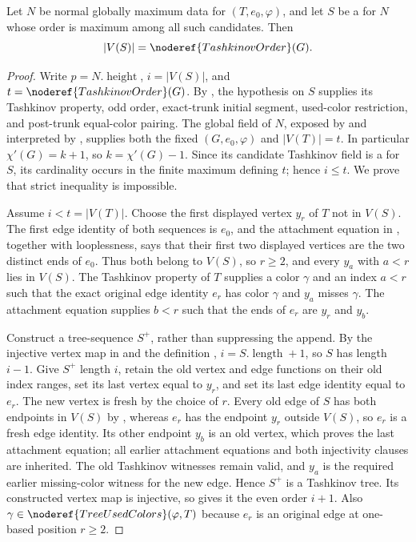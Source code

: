 \begin{helper}
Let $N$ be normal globally maximum data for $(T,e_0,\varphi)$, and let
$S$ be a  for $N$ whose order is maximum
among all such candidates.  Then
\[
 |V(S)|=\noderef{TashkinovOrder}(G).
\]
\end{helper}
\begin{proof}
Write $p=N.\operatorname{height}$, $i=|V(S)|$, and
$t=\noderef{TashkinovOrder}(G)$.  By
, the hypothesis on $S$ supplies its
Tashkinov property, odd order, exact-trunk initial segment, used-color
restriction, and post-trunk equal-color pairing.  The global field of $N$,
exposed by  and interpreted by
, supplies both the fixed
 $(G,e_0,\varphi)$ and $|V(T)|=t$.  In particular
$\chi'(G)=k+1$, so $k=\chi'(G)-1$.  Since its candidate Tashkinov field is
a  for $S$, its cardinality occurs in the finite
maximum defining $t$; hence $i\le t$.  We prove that strict inequality is
impossible.

Assume $i<t=|V(T)|$.  Choose the first displayed vertex $y_r$ of $T$ not
in $V(S)$.  The first edge identity of both sequences is $e_0$, and the
attachment equation in , together with looplessness,
says that their first two displayed vertices are the two distinct ends of
$e_0$.  Thus both belong to $V(S)$, so $r\ge2$, and every $y_a$ with
$a<r$ lies in $V(S)$.  The Tashkinov property of $T$ supplies a color
$\gamma$ and an index $a<r$ such that the exact original edge identity
$e_r$ has color $\gamma$ and $y_a$ misses $\gamma$.  The attachment
equation supplies $b<r$ such that the ends of $e_r$ are $y_r$ and $y_b$.

Construct a tree-sequence $S^+$, rather than suppressing the append.  By
the injective vertex map in  and the definition
, $i=S.\operatorname{length}+1$, so $S$ has
length $i-1$.  Give $S^+$ length $i$, retain the old vertex and edge
functions on their old index ranges, set its last vertex equal to $y_r$,
and set its last edge identity equal to $e_r$.  The new vertex is fresh by
the choice of $r$.  Every old edge of $S$ has both endpoints in $V(S)$ by
, whereas $e_r$ has the endpoint $y_r$ outside
$V(S)$, so $e_r$ is a fresh edge identity.  Its other endpoint $y_b$ is an
old vertex, which proves the last attachment equation; all earlier
attachment equations and both injectivity clauses are inherited.  The old
Tashkinov witnesses remain valid, and $y_a$ is the required earlier
missing-color witness for the new edge.  Hence $S^+$ is a Tashkinov tree.
Its constructed vertex map is injective, so
 gives it the even order $i+1$.  Also
$\gamma\in\noderef{TreeUsedColors}(\varphi,T)$ because $e_r$ is an
original edge at one-based position $r\ge2$.


\end{proof}
